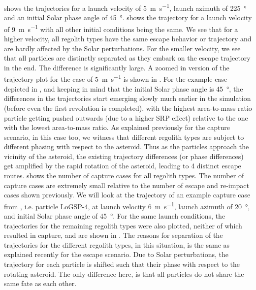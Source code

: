  shows the trajectories for a launch velocity of \SI{5}{\metre\per\second}, launch azimuth of \SI{225}{\degree} and an initial Solar phase angle of \SI{45}{\degree}.  shows the trajectory for a launch velocity of \SI{9}{\metre\per\second} with all other initial conditions being the same. We see that for a higher velocity, all regolith types have the same escape behavior or trajectory and are hardly affected by the Solar perturbations. For the smaller velocity, we see that all particles are distinctly separated as they embark on the escape trajectory in the end. The difference is significantly large. A zoomed in version of the trajectory plot for the case of \SI{5}{\metre\per\second} is shown in . For the example case depicted in , and keeping in mind that the initial Solar phase angle is \SI{45}{\degree}, the differences in the trajectories start emerging slowly much earlier in the simulation (before even the first revolution is completed), with the highest area-to-mass ratio particle getting pushed outwards (due to a higher \gls{SRP} effect) relative to the one with the lowest area-to-mass ratio. As explained previously for the capture scenario, in this case too, we witness that different regolith types are subject to different phasing with respect to the asteroid. Thus as the particles approach the vicinity of the asteroid, the existing trajectory differences (or phase differences) get amplified by the rapid rotation of the asteroid, leading to 4 distinct escape routes.
%
\newline\newline
%
 shows the number of capture cases for all regolith types. The number of capture cases are extremely small relative to the number of escape and re-impact cases shown previously. We will look at the trajectory of an example capture case from , i.e. particle LoGSP-4, at launch velocity \SI{6}{\metre\per\second}, launch azimuth of \SI{20}{\degree}, and initial Solar phase angle of \SI{45}{\degree}. For the same launch conditions, the trajectories for the remaining regolith types were also plotted, neither of which resulted in capture, and are shown in . The reasons for separation of the trajectories for the different regolith types, in this situation, is the same as explained recently for the escape scenario. Due to Solar perturbations, the trajectory for each particle is shifted such that their phase with respect to the rotating asteroid. The only difference here, is that all particles do not share the same fate as each other.
